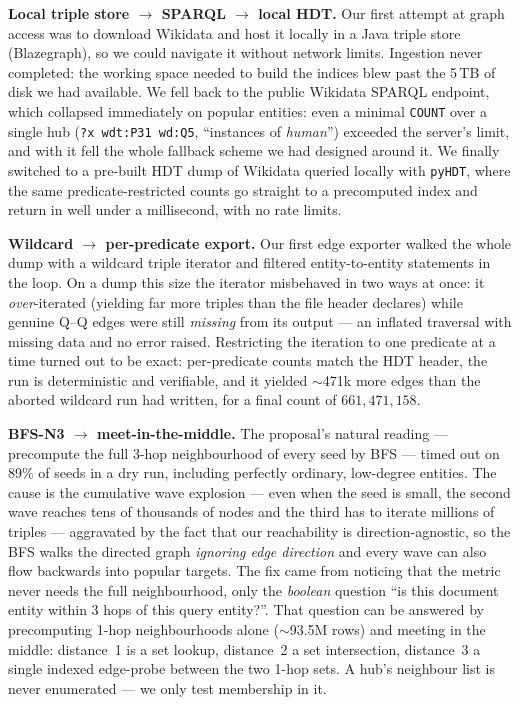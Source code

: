 \documentclass{article}
\begin{document}
\textbf{Local triple store $\to$ SPARQL $\to$ local HDT.} Our first attempt at graph access was to download Wikidata and host it locally in a Java triple store (Blazegraph), so we could navigate it without network limits. Ingestion never completed: the working space needed to build the indices blew past the 5\,TB of disk we had available. We fell back to the public Wikidata SPARQL endpoint, which collapsed immediately on popular entities: even a minimal \texttt{COUNT} over a single hub (\texttt{?x wdt:P31 wd:Q5}, ``instances of \emph{human}'') exceeded the server's limit, and with it fell the whole fallback scheme we had designed around it. We finally switched to a pre-built HDT dump of Wikidata queried locally with \texttt{pyHDT}, where the same predicate-restricted counts go straight to a precomputed index and return in well under a millisecond, with no rate limits.

\textbf{Wildcard $\to$ per-predicate export.} Our first edge exporter walked the whole dump with a wildcard triple iterator and filtered entity-to-entity statements in the loop. On a dump this size the iterator misbehaved in two ways at once: it \emph{over}-iterated (yielding far more triples than the file header declares) while genuine Q--Q edges were still \emph{missing} from its output --- an inflated traversal with missing data and no error raised. Restricting the iteration to one predicate at a time turned out to be exact: per-predicate counts match the HDT header, the run is deterministic and verifiable, and it yielded $\sim$471k more edges than the aborted wildcard run had written, for a final count of $661{,}471{,}158$.

\textbf{BFS-N3 $\to$ meet-in-the-middle.} The proposal's natural reading --- precompute the full 3-hop neighbourhood of every seed by BFS --- timed out on 89\% of seeds in a dry run, including perfectly ordinary, low-degree entities. The cause is the cumulative wave explosion --- even when the seed is small, the second wave reaches tens of thousands of nodes and the third has to iterate millions of triples --- aggravated by the fact that our reachability is direction-agnostic, so the BFS walks the directed graph \emph{ignoring edge direction} and every wave can also flow backwards into popular targets. The fix came from noticing that the metric never needs the full neighbourhood, only the \emph{boolean} question ``is this document entity within 3 hops of this query entity?''. That question can be answered by precomputing 1-hop neighbourhoods alone ($\sim$93.5M rows) and meeting in the middle: distance~1 is a set lookup, distance~2 a set intersection, distance~3 a single indexed edge-probe between the two 1-hop sets. A hub's neighbour list is never enumerated --- we only test membership in it.
\end{document}
